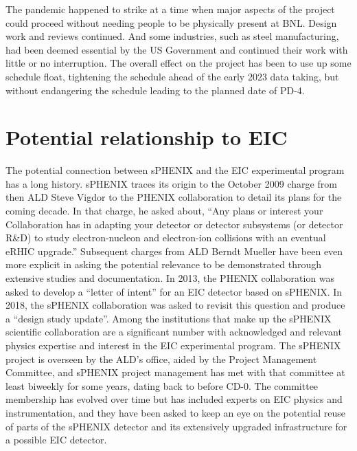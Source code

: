 The pandemic happened to strike at a time when major aspects of the
project could proceed without needing people to be physically present
at BNL.  Design work and reviews continued.  And some industries, such
as steel manufacturing, had been deemed essential by the US Government
and continued their work with little or no interruption.  The overall
effect on the project has been to use up some schedule float,
tightening the schedule ahead of the early 2023 data taking, but
without endangering the schedule leading to the planned date of PD-4.


\section{Potential relationship to EIC}
\label{sec:eic}

The potential connection between sPHENIX and the EIC experimental
program has a long history.  sPHENIX traces its origin to the October
2009 charge from then ALD Steve Vigdor to the PHENIX collaboration to
detail its plans for the coming decade.  In that charge, he asked
about, ``Any plans or interest your Collaboration has in adapting your
detector or detector subsystems (or detector R\&D) to study
electron-nucleon and electron-ion collisions with an eventual eRHIC
upgrade.''  Subsequent charges from ALD Berndt Mueller have been even
more explicit in asking the potential relevance to be demonstrated
through extensive studies and documentation.  In 2013, the PHENIX
collaboration was asked to develop a ``letter of intent'' for an EIC
detector based on sPHENIX.  In 2018, the sPHENIX collaboration was
asked to revisit this question and produce a ``design study update''.
Among the institutions that make up the sPHENIX scientific
collaboration are a significant number with acknowledged and relevant
physics expertise and interest in the EIC experimental program.  The
sPHENIX project is overseen by the ALD's office, aided by the Project
Management Committee, and sPHENIX project management has met with that
committee at least biweekly for some years, dating back to before
CD-0.  The committee membership has evolved over time but has included
experts on EIC physics and instrumentation, and they have been asked
to keep an eye on the potential reuse of parts of the sPHENIX detector
and its extensively upgraded infrastructure for a possible EIC
detector.

